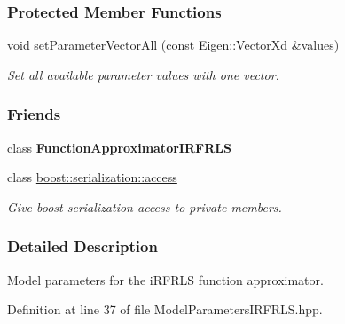 \subsubsection*{Protected Member Functions}
\begin{DoxyCompactItemize}
\item 
void \hyperlink{classDmpBbo_1_1ModelParametersIRFRLS_a9d3c8f22e8237a805af4935a647e5a50}{set\+Parameter\+Vector\+All} (const Eigen\+::\+Vector\+Xd \&values)
\begin{DoxyCompactList}\small\item\em Set all available parameter values with one vector. \end{DoxyCompactList}\end{DoxyCompactItemize}
\subsubsection*{Friends}
\begin{DoxyCompactItemize}
\item 
\hypertarget{classDmpBbo_1_1ModelParametersIRFRLS_a66b3e6b2208ab42c25ea2b7a8ed35b22}{class {\bfseries Function\+Approximator\+I\+R\+F\+R\+L\+S}}\label{classDmpBbo_1_1ModelParametersIRFRLS_a66b3e6b2208ab42c25ea2b7a8ed35b22}

\item 
class \hyperlink{classDmpBbo_1_1ModelParametersIRFRLS_ac98d07dd8f7b70e16ccb9a01abf56b9c}{boost\+::serialization\+::access}
\begin{DoxyCompactList}\small\item\em Give boost serialization access to private members. \end{DoxyCompactList}\end{DoxyCompactItemize}


\subsubsection{Detailed Description}
Model parameters for the i\+R\+F\+R\+L\+S function approximator. 

Definition at line 37 of file Model\+Parameters\+I\+R\+F\+R\+L\+S.\+hpp.



